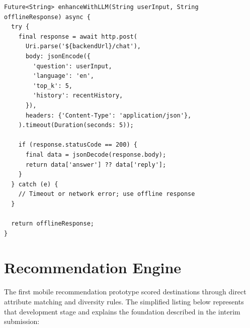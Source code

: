 \documentclass[12pt,a4paper,oneside]{report}
\begin{document}
\begin{lstlisting}
Future<String> enhanceWithLLM(String userInput, String offlineResponse) async {
  try {
    final response = await http.post(
      Uri.parse('${backendUrl}/chat'),
      body: jsonEncode({
        'question': userInput,
        'language': 'en',
        'top_k': 5,
        'history': recentHistory,
      }),
      headers: {'Content-Type': 'application/json'},
    ).timeout(Duration(seconds: 5));
    
    if (response.statusCode == 200) {
      final data = jsonDecode(response.body);
      return data['answer'] ?? data['reply'];
    }
  } catch (e) {
    // Timeout or network error; use offline response
  }
  
  return offlineResponse;
}
\end{lstlisting}

\section{Recommendation Engine}
\label{sec:recommendation_impl}

The first mobile recommendation prototype scored destinations through direct attribute matching and diversity rules. The simplified listing below represents that development stage and explains the foundation described in the interim submission:
\end{document}
